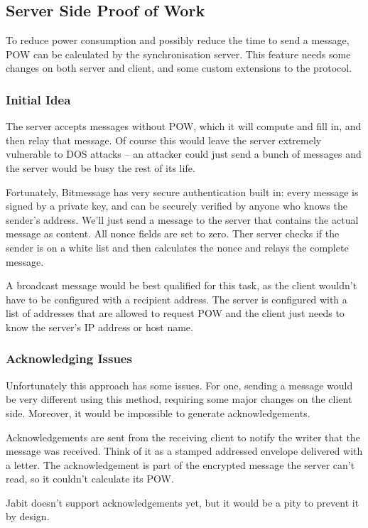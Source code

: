 \documentclass{bfh}
\begin{document}
  \subsection{Server Side Proof of Work}
  To reduce power consumption and possibly reduce the time to send a message, \ac{POW} can be calculated by the synchronisation server. This feature needs some changes on both server and client, and some custom extensions to the protocol.

  \subsubsection{Initial Idea}
  The server accepts messages without \ac{POW}, which it will compute and fill in, and then relay that message. Of course this would leave the server extremely vulnerable to \ac{DOS} attacks -- an attacker could just send a bunch of messages and the server would be busy the rest of its life.

  Fortunately, Bitmessage has very secure authentication built in: every message is signed by a private key, and can be securely verified by anyone who knows the sender's address. We'll just send a message to the server that contains the actual message as content. All nonce fields are set to zero. Ther server checks if the sender is on a white list and then calculates the nonce and relays the complete message.

  A broadcast message would be best qualified for this task, as the client wouldn't have to be configured with a recipient address. The server is configured with a list of addresses that are allowed to request \ac{POW} and the client just needs to know the server's IP address or host name.

  \subsubsection{Acknowledging Issues}
  Unfortunately this approach has some issues. For one, sending a message would be very different using this method, requiring some major changes on the client side. Moreover, it would be impossible to generate acknowledgements.

  Acknowledgements are sent from the receiving client to notify the writer that the message was received. Think of it as a stamped addressed envelope delivered with a letter. The acknowledgement is part of the encrypted message the server can't read, so it couldn't calculate its \ac{POW}.

  Jabit doesn't support acknowledgements yet, but it would be a pity to prevent it by design.
\end{document}
